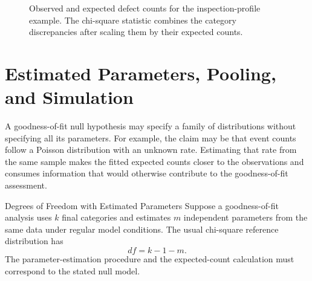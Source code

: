 \begin{figure}[htbp]
\centering
{}
\caption{Observed and expected defect counts for the inspection-profile example. The chi-square statistic combines the category discrepancies after scaling them by their expected counts.}
\label{fig:gof-observed-expected}
\end{figure}

\FloatBarrier

\section{Estimated Parameters, Pooling, and Simulation}
\label{sec:chi-square-estimated-simulation}

A goodness-of-fit null hypothesis may specify a family of distributions without specifying all its parameters. For example, the claim may be that event counts follow a Poisson distribution with an unknown rate. Estimating that rate from the same sample makes the fitted expected counts closer to the observations and consumes information that would otherwise contribute to the goodness-of-fit assessment.

\begin{theorem}{Degrees of Freedom with Estimated Parameters}
Suppose a goodness-of-fit analysis uses $k$ final categories and estimates $m$ independent parameters from the same data under regular model conditions. The usual chi-square reference distribution has
\[
df=k-1-m.
\]
The parameter-estimation procedure and the expected-count calculation must correspond to the stated null model.
\end{theorem}


